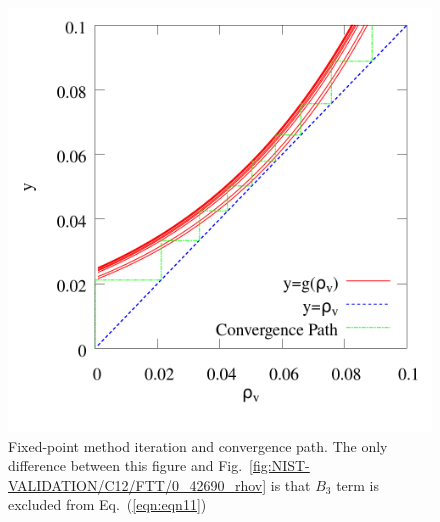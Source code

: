 \documentclass[%
 aip,
 jcp,
 sd,%
 amsmath,amssymb,
 reprint,%
]{revtex4-1}
\begin{document}
\begin{figure} 
\includegraphics[scale=0.25]{Figures/NIST-VAL_FTF_C12_conv_0_42690.png}
\caption{Fixed-point method iteration and convergence path. The only difference between this figure and Fig.~\ref{fig:NIST-VALIDATION/C12/FTT/0_42690_rhov} is that $B_3$ term is excluded from Eq.~(\ref{eqn:eqn11})}
\label{fig:NIST-VALIDATION/C12/FTF/0_42690_rhov}
\end{figure}
\end{document}

